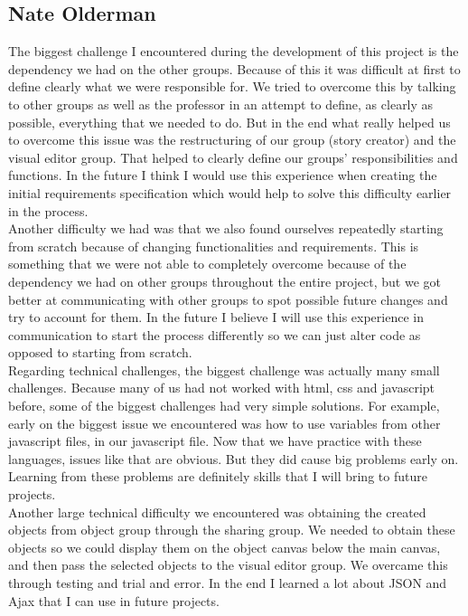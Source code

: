 \documentclass[12pt]{article}
\begin{document}
\subsection{Nate Olderman}
The biggest challenge I encountered during the development of this project is the dependency we had on the other groups. Because of this it was difficult at first to define clearly what we were responsible for. We tried to overcome this by talking to other groups as well as the professor in an attempt to define, as clearly as possible, everything that we needed to do. But in the end what really helped us to overcome this issue was the restructuring of our group (story creator) and the visual editor group. That helped to clearly define our groups' responsibilities and functions. In the future I think I would use this experience when creating the initial requirements specification which would help to solve this difficulty earlier in the process. \\
Another difficulty we had was that we also found ourselves repeatedly starting from scratch because of changing functionalities and requirements. This is something that we were not able to completely overcome because of the dependency we had on other groups throughout the entire project, but we got better at communicating with other groups to spot possible future changes and try to account for them. In the future I believe I will use this experience in communication to start the process differently so we can just alter code as opposed to starting from scratch. \\
Regarding technical challenges, the biggest challenge was actually many small challenges. Because many of us had not worked with html, css and javascript before, some of the biggest challenges had very simple solutions. For example, early on the biggest issue we encountered was how to use variables from other javascript files, in our javascript file. Now that we have practice with these languages, issues like that are obvious. But they did cause big problems early on. Learning from these problems are definitely skills that I will bring to future projects. \\
Another large technical difficulty we encountered was obtaining the created objects from object group through the sharing group. We needed to obtain these objects so we could display them on the object canvas below the main canvas, and then pass the selected objects to the visual editor group. We overcame this through testing and trial and error. In the end I learned a lot about JSON and Ajax that I can use in future projects. \\
\end{document}
